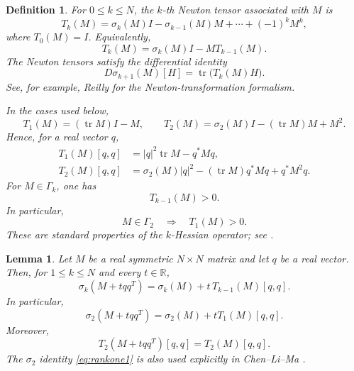 \documentclass{article}
\newtheorem{lemma}[theorem]{Lemma}
\newtheorem{definition}[theorem]{Definition}
\newcommand{\R}{\mathbb R}
\newcommand{\tr}{\operatorname{tr}}
\numberwithin{equation}{section}
\begin{document}
\begin{definition}
\label{def:newton-tensors}
For $0\le k\le N$, the $k$-th Newton tensor associated with $M$ is
\begin{equation}\label{eq:newton-general}
T_k(M)
=
\sigma_k(M)I-\sigma_{k-1}(M)M+\cdots+(-1)^kM^k,
\end{equation}
where $T_0(M)=I$. Equivalently,
\begin{equation}\label{eq:newton-recursion}
T_k(M)=\sigma_k(M)I-MT_{k-1}(M).
\end{equation}
The Newton tensors satisfy the differential identity
\begin{equation}\label{eq:newton-derivative}
D\sigma_{k+1}(M)[H]
=
\tr\bigl(T_k(M)H\bigr).
\end{equation}
See, for example, Reilly \cite{Reilly77} for the Newton-transformation
formalism.

In the cases used below,
\begin{equation}\label{eq:T1T2}
T_1(M)=(\tr M)I-M,
\qquad
T_2(M)=\sigma_2(M)I-(\tr M)M+M^2.
\end{equation}
Hence, for a real vector $q$,
\begin{align}
T_1(M)[q,q]
&=
|q|^2\tr M-q^*Mq,
\label{eq:T1-explicit-main}\\
T_2(M)[q,q]
&=
\sigma_2(M)|q|^2
-(\tr M)q^*Mq
+q^*M^2q.
\label{eq:T2-explicit-main}
\end{align}
For $M\in\Gamma_k$, one has
\begin{equation}\label{eq:newton-positive}
T_{k-1}(M)>0.
\end{equation}
In particular,
\begin{equation}\label{eq:T1-positive}
M\in\Gamma_2
\quad\Longrightarrow\quad
T_1(M)>0.
\end{equation}
These are standard properties of the $k$-Hessian operator; see
\cite{CNS85}.
\end{definition}

\begin{lemma}
\label{lem:rank-one-perturbation}
Let $M$ be a real symmetric $N\times N$ matrix and let $q$
be a real vector. Then, for $1\le k\le N$ and every $t\in\R$,
\begin{equation}\label{eq:rankone-general}
\sigma_k(M+tqq^{T})
=
\sigma_k(M)
+t\,T_{k-1}(M)[q,q].
\end{equation}
In particular,
\begin{equation}\label{eq:rankone1}
\sigma_2(M+tqq^{T})
=
\sigma_2(M)
+tT_1(M)[q,q].
\end{equation}
Moreover,
\begin{equation}\label{eq:rankone2}
T_2(M+tqq^{T})[q,q]
=
T_2(M)[q,q].
\end{equation}
The $\sigma_2$ identity \eqref{eq:rankone1} is also used explicitly in
Chen--Li--Ma \cite[Eq.~(3.2)]{CLM26}.
\end{lemma}
\end{document}
